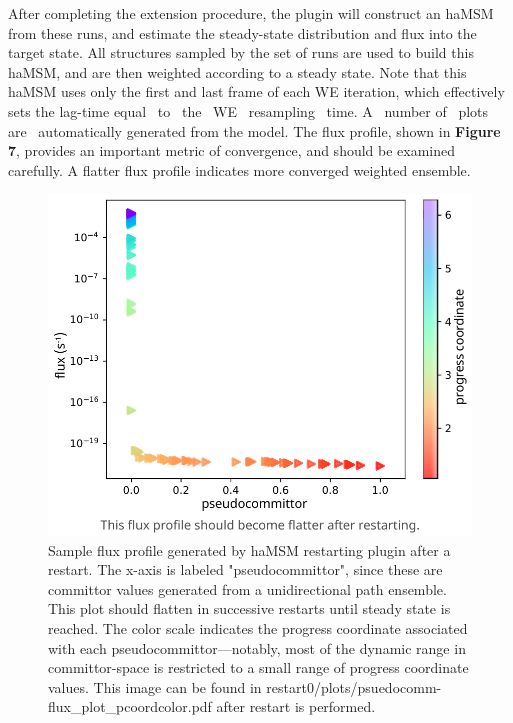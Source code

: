 After completing the extension procedure, the plugin will construct an haMSM from these runs, and estimate the steady-state distribution and flux into the target state. 
All structures sampled by the set of runs are used to build this haMSM, and are then weighted according to a steady state. 
Note that this haMSM uses only the first and last frame of each WE iteration, which effectively sets the lag-time equal~ to~ the~ WE~ resampling~ time. A~ number of~ plots~ are~ automatically generated from the model. 
The flux profile, shown in \textbf{Figure 7}, provides an important metric of convergence, and should be examined carefully. 
A flatter flux profile indicates more converged weighted ensemble.

\begin{figure}[t]
    \centering
    \includegraphics[width=\columnwidth]{figures/Figure7_committor.pdf}
    \caption{Sample flux profile generated by haMSM restarting plugin after a restart. 
    The x-axis is labeled "pseudocommittor", since these are committor values generated from a unidirectional path ensemble. 
    This plot should flatten in successive restarts until steady state is reached.
    The color scale indicates the progress coordinate associated with each pseudocommittor---notably, most of the dynamic range in committor-space is restricted to a small range of progress coordinate values. 
    This image can be found in restart0/plots/psuedocomm-flux\_plot\_pcoordcolor.pdf after restart is performed.}
\end{figure}

